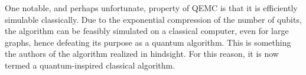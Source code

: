 
One notable, and perhaps unfortunate, property of QEMC is that it is efficiently simulable classically. Due to the exponential compression of the number of qubits, the algorithm can be feasibly simulated on a classical computer, even for large graphs, hence defeating its purpose as a quantum algorithm. This is something the authors of the algorithm \cite{tenecohen2023variational} realized in hindsight. For this reason, it is now termed a quantum-inspired classical algorithm.


